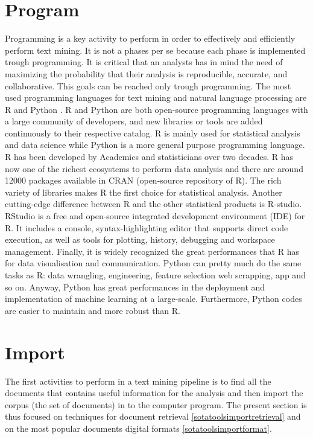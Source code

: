\documentclass[]{book}
\begin{document}
\section{Program}\label{sotatoolsprogram}

Programming is a key activity to perform in order to effectively and
efficiently perform text mining. It is not a phases per se because each
phase is implemented trough programming. It is critical that an analysts
has in mind the need of maximizing the probability that their analysis
is reproducible, accurate, and collaborative. This goals can be reached
only trough programming. The most used programming languages for text
mining and natural language processing are R \citep{r2008} and Python
\citep{py95}. R and Python are both open-source programming languages
with a large community of developers, and new libraries or tools are
added continuously to their respective catalog. R is mainly used for
statistical analysis and data science while Python is a more general
purpose programming language. R has been developed by Academics and
statisticians over two decades. R has now one of the richest ecosystems
to perform data analysis and there are around 12000 packages available
in CRAN (open-source repository of R). The rich variety of libraries
makes R the first choice for statistical analysis. Another cutting-edge
difference between R and the other statistical products is R-studio.
RStudio is a free and open-source integrated development environment
(IDE) for R. It includes a console, syntax-highlighting editor that
supports direct code execution, as well as tools for plotting, history,
debugging and workspace management. Finally, it is widely recognized the
great performances that R has for data visualisation and communication.
Python can pretty much do the same tasks as R: data wrangling,
engineering, feature selection web scrapping, app and so on. Anyway,
Python has great performances in the deployment and implementation of
machine learning at a large-scale. Furthermore, Python codes are easier
to maintain and more robust than R.

\section{Import}\label{sotatoolsimport}

The first activities to perform in a text mining pipeline is to find all
the documents that contains useful information for the analysis and then
import the corpus (the set of documents) in to the computer program. The
present section is thus focused on techniques for document retrieval
\ref{sotatoolsimportretrieval} and on the most popular documents digital
formats \ref{sotatoolsimportformat}.
\end{document}
